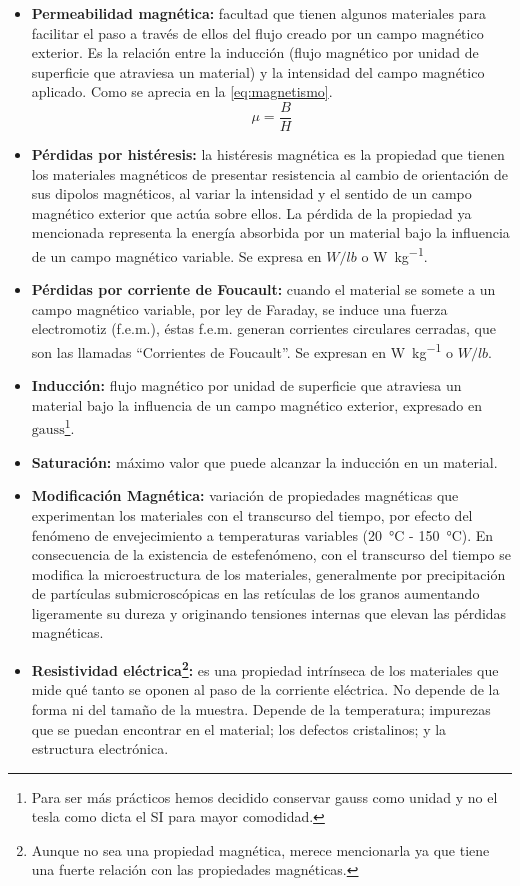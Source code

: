 \documentclass[12pt,a4paper]{article}
\begin{document}
\begin{itemize}
    \item \textbf{Permeabilidad magnética:} facultad que tienen algunos materiales para facilitar el paso a través de ellos del flujo creado por un campo magnético exterior. Es la relación entre la inducción (flujo magnético por unidad de superficie que atraviesa un material) y la intensidad del campo magnético aplicado. Como se aprecia en la \autoref{eq:magnetismo}.
    \begin{equation} \label{eq:magnetismo}
        \mu  = \frac{B}{H}
    \end{equation}
    \item \textbf{Pérdidas por histéresis:} la histéresis magnética es la propiedad que tienen los materiales magnéticos de presentar resistencia al cambio de orientación de sus dipolos magnéticos, al variar la intensidad y el sentido de un campo magnético exterior que actúa sobre ellos. La pérdida de la propiedad ya mencionada representa la energía absorbida por un material bajo la influencia de un campo magnético variable. Se expresa en $W/lb$ o \si{\watt\per\kilogram}.
    \item \textbf{Pérdidas por corriente de Foucault:} cuando el material se somete a un campo magnético variable, por ley de Faraday, se induce una fuerza electromotiz (f.e.m.), éstas f.e.m. generan corrientes circulares cerradas, que son las llamadas \enquote{Corrientes de Foucault}. Se expresan en \si{\watt\per\kilo\gram} o $W/lb$.
    \item \textbf{Inducción:} flujo magnético por unidad de superficie que atraviesa un material bajo la influencia de un campo magnético exterior, expresado en $\mathrm{gauss}$\footnote{Para ser más prácticos hemos decidido conservar gauss como unidad y no el tesla como dicta el SI para mayor comodidad.}.
    \item \textbf{Saturación:} máximo valor que puede alcanzar la inducción en un material.
    \item \textbf{Modificación Magnética:} variación de propiedades magnéticas que experimentan los materiales con el transcurso del tiempo, por efecto del fenómeno de envejecimiento a temperaturas variables (\SI{20}{\celsius} - \SI{150}{\celsius}). En consecuencia de la existencia de estefenómeno, con el transcurso del tiempo se modifica la microestructura de los materiales, generalmente por precipitación de partículas submicroscópicas en las retículas de los granos aumentando ligeramente su dureza y originando tensiones internas que elevan las  pérdidas magnéticas.
    \item \textbf{Resistividad eléctrica\footnote{Aunque no sea una propiedad magnética, merece mencionarla ya que tiene una fuerte relación con las propiedades magnéticas.}:} es una propiedad intrínseca de los materiales que mide qué tanto se oponen al paso de la corriente eléctrica. No depende de la forma ni del tamaño de la muestra. Depende de la temperatura; impurezas que se puedan encontrar en el material; los defectos cristalinos; y la estructura electrónica.
\end{itemize}
\end{document}

